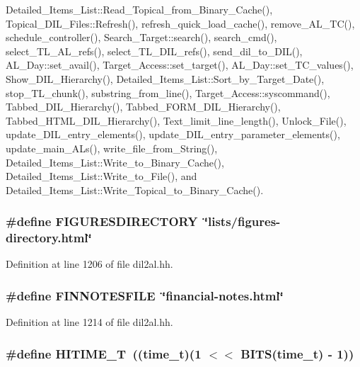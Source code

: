 Detailed\_\-Items\_\-List::Read\_\-Topical\_\-from\_\-Binary\_\-Cache(), Topical\_\-DIL\_\-Files::Refresh(), refresh\_\-quick\_\-load\_\-cache(), remove\_\-AL\_\-TC(), schedule\_\-controller(), Search\_\-Target::search(), search\_\-cmd(), select\_\-TL\_\-AL\_\-refs(), select\_\-TL\_\-DIL\_\-refs(), send\_\-dil\_\-to\_\-DIL(), AL\_\-Day::set\_\-avail(), Target\_\-Access::set\_\-target(), AL\_\-Day::set\_\-TC\_\-values(), Show\_\-DIL\_\-Hierarchy(), Detailed\_\-Items\_\-List::Sort\_\-by\_\-Target\_\-Date(), stop\_\-TL\_\-chunk(), substring\_\-from\_\-line(), Target\_\-Access::syscommand(), Tabbed\_\-DIL\_\-Hierarchy(), Tabbed\_\-FORM\_\-DIL\_\-Hierarchy(), Tabbed\_\-HTML\_\-DIL\_\-Hierarchy(), Text\_\-limit\_\-line\_\-length(), Unlock\_\-File(), update\_\-DIL\_\-entry\_\-elements(), update\_\-DIL\_\-entry\_\-parameter\_\-elements(), update\_\-main\_\-ALs(), write\_\-file\_\-from\_\-String(), Detailed\_\-Items\_\-List::Write\_\-to\_\-Binary\_\-Cache(), Detailed\_\-Items\_\-List::Write\_\-to\_\-File(), and Detailed\_\-Items\_\-List::Write\_\-Topical\_\-to\_\-Binary\_\-Cache().
\subsubsection{\setlength{\rightskip}{0pt plus 5cm}\#define FIGURESDIRECTORY\ \char`\"{}lists/figures-directory.html\char`\"{}}\label{dil2al_8hh_a59}




Definition at line 1206 of file dil2al.hh.
\subsubsection{\setlength{\rightskip}{0pt plus 5cm}\#define FINNOTESFILE\ \char`\"{}financial-notes.html\char`\"{}}\label{dil2al_8hh_a67}




Definition at line 1214 of file dil2al.hh.
\subsubsection{\setlength{\rightskip}{0pt plus 5cm}\#define HITIME\_\-T\ ((time\_\-t)(1 $<$$<$ BITS(time\_\-t) - 1))}\label{dil2al_8hh_a2}




